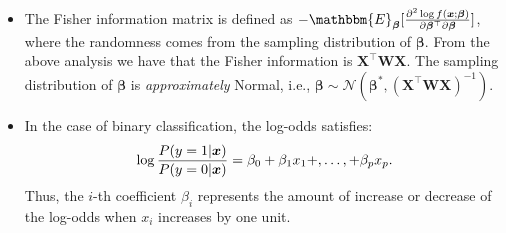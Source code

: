 {\begin{itemize}
                    \begin{equation}
                        \begin{aligned}
                            \bm{\beta}^t & = \bm{\beta}^{t-1} + \left(\bm{X}^\top \bm{W} \bm{X}\right)^{-1} \bm{X}^\top (\bm{y} - \bm{p}) \\
                                         & = \left(\bm{X}^\top \bm{W} \bm{X}\right)^{-1}\bm{X}^\top \bm{W} \bm{X} \bm{\beta}^{t-1} + \left(\bm{X}^\top \bm{W} \bm{X}\right)^{-1} \bm{X}^\top \bm{W} \bm{W}^{-1} (\bm{y} - \bm{p}) \\
                                         & = \left(\bm{X}^\top \bm{W} \bm{X}\right)^{-1}\bm{X}^\top \bm{W} \left( \underbrace{\bm{X}\bm{\beta}^{t-1} + \bm{W}^{-1}(\bm{y} - \bm{p})}_{:=\bm{z}} \right) \\
                                         & = \left(\bm{X}^\top \bm{W} \bm{X}\right)^{-1}\bm{X}^\top \bm{W} \bm{z}.
                        \end{aligned}
                    \end{equation}
                The last step is called \emph{Iteratively Reweighted Least Square}.
                Compare it with the update rule of linear regression, i.e., $\left( \bm{X}^\top \bm{X}\right)^{-1} \bm{X}^\top \bm{y}$.
                \item The Fisher information matrix is defined as $-\mathbbm{E}_{\bm{\beta}}[ \frac{\partial^2 \log f(\bm{x}; \bm{\beta})}{\partial \bm{\beta}^\top \partial \bm{\beta}} ]$, where the randomness comes from the sampling distribution of $\bm{\beta}$.
                From the above analysis we have that the Fisher information is $\bm{X}^\top \bm{W} \bm{X}$.
                The sampling distribution of $\bm{\beta}$ is \emph{approximately} Normal, i.e., $\bm{\beta} \sim \mathcal{N}(\bm{\beta}^\ast, \left(\bm{X}^\top \bm{W} \bm{X}\right)^{-1})$.
                \item In the case of binary classification, the log-odds satisfies:
                    \begin{equation}
                        \log \frac{P(y=1 | \bm{x})}{P(y=0 | \bm{x})}  = \beta_0 + \beta_1 x_1 +, \ldots, + \beta_p x_p.
                    \end{equation}
                Thus, the $i$-th coefficient $\beta_i$ represents the amount of increase or decrease of the log-odds when $x_i$ increases by one unit.
            \end{itemize}
            
}
